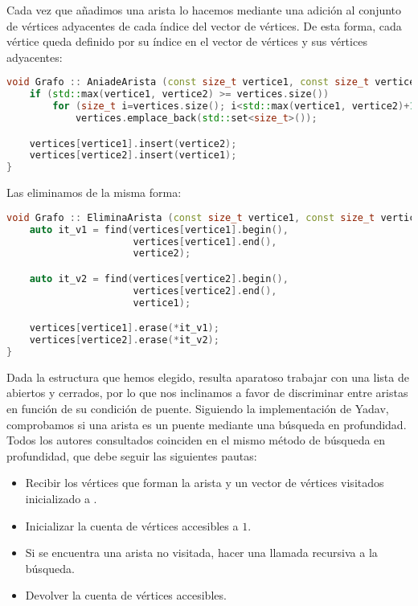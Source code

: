Cada vez que añadimos una arista lo hacemos mediante una adición al conjunto de vértices adyacentes de cada índice del vector de vértices.
De esta forma, cada vértice queda definido por su índice en el vector de vértices y sus vértices adyacentes:

\begin{lstlisting}[language=C++]
void Grafo :: AniadeArista (const size_t vertice1, const size_t vertice2) {
	if (std::max(vertice1, vertice2) >= vertices.size())
		for (size_t i=vertices.size(); i<std::max(vertice1, vertice2)+1; i++)
			vertices.emplace_back(std::set<size_t>());

	vertices[vertice1].insert(vertice2);
	vertices[vertice2].insert(vertice1);
}
\end{lstlisting}

Las eliminamos de la misma forma:

\begin{lstlisting}[language=C++]
void Grafo :: EliminaArista (const size_t vertice1, const size_t vertice2) {
	auto it_v1 = find(vertices[vertice1].begin(),
	                  vertices[vertice1].end(),
	                  vertice2);

	auto it_v2 = find(vertices[vertice2].begin(),
	                  vertices[vertice2].end(),
	                  vertice1);

	vertices[vertice1].erase(*it_v1);
	vertices[vertice2].erase(*it_v2);
}
\end{lstlisting}

Dada la estructura que hemos elegido, resulta aparatoso trabajar con una lista de abiertos y cerrados, por lo que nos inclinamos a favor de discriminar entre aristas en función de su condición de puente.
Siguiendo la implementación de Yadav, comprobamos si una arista es un puente mediante una búsqueda en profundidad.
Todos los autores consultados coinciden en el mismo método de búsqueda en profundidad, que debe seguir las siguientes pautas:

\begin{itemize}
	\item Recibir los vértices que forman la arista y un vector de vértices visitados inicializado a .
	\item Inicializar la cuenta de vértices accesibles a $1$.
	\item Si se encuentra una arista no visitada, hacer una llamada recursiva a la búsqueda.
	\item Devolver la cuenta de vértices accesibles.
\end{itemize}

